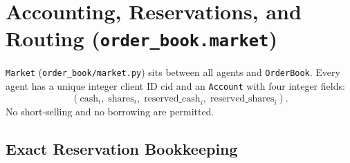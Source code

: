 \documentclass[11pt,a4paper]{article}
\newcommand{\code}[1]{\texttt{#1}}
\begin{document}
\section[Accounting, Reservations, and Routing]{Accounting, Reservations, and Routing (\code{order\_book.market})}
\label{sec:market}

\code{Market} (\code{order\_book/market.py}) sits between all agents and \code{OrderBook}. Every agent
has a unique integer client ID $\text{cid}$ and an \code{Account} with four integer fields:
\[
  (\text{cash}_i,\; \text{shares}_i,\; \text{reserved\_cash}_i,\; \text{reserved\_shares}_i).
\]
No short-selling and no borrowing are permitted.

\subsection{Exact Reservation Bookkeeping}
\end{document}
